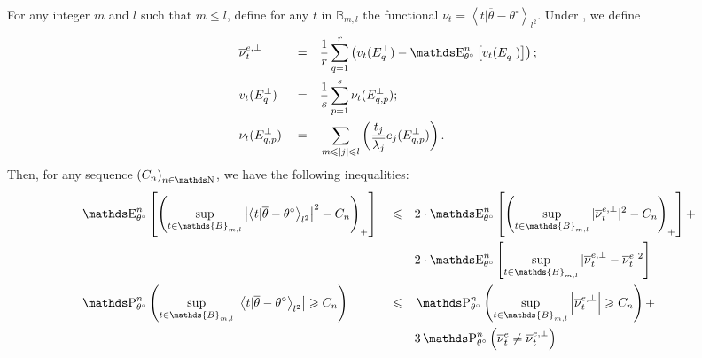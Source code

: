 \begin{pr}\label{PRD.5.4}
For any integer $m$ and $l$ such that $m \leq l$, define for any $t$ in $\mathds{B}_{m, l}$ the functional $\overline{\nu}_{t} = \left\langle t \vert \overline{\theta} - \theta^{\circ}\right\rangle_{l^{2}}$.
Under , we define
\begin{alignat*}{3}
& \overline{\nu}^{e, \perp}_{t} && = && \frac{1}{r} \sum\limits_{q = 1}^{r} \left(v_{t}(E^{\perp}_{q}) - \E_{\theta^{\circ}}^{n}\left[v_{t}(E^{\perp}_{q})\right]\right);\\
& v_{t}(E^{\perp}_{q}) && = && \frac{1}{s} \sum\limits_{p = 1}^{s} \nu_{t}(E^{\perp}_{q, p});\\
& \nu_{t}(E^{\perp}_{q, p}) && = && \sum\limits_{m \leq \vert j \vert \leq l} \left(\frac{t_{j}}{\overline{\lambda_{j}}} e_{j}(E^{\perp}_{q, p})\right).
\end{alignat*}
Then, for any sequence $\left(C_{n}\right)_{n \in \N}$, we have the following inequalities:
\begin{alignat}{3}
& \E_{\theta^{\circ}}^{n} \left[ \left(\sup\limits_{t \in \mathds{B}_{m, l}} \left\vert\left\langle t \vert \overline{\theta} - \theta^{\circ}\right\rangle_{l^{2}} \right\vert^{2} - C_{n} \right)_{+} \right] && \leq && 2 \cdot \E_{\theta^{\circ}}^{n}\left[ \left(\sup\limits_{t \in \mathds{B}_{m, l}} \vert \overline{\nu}^{e, \perp}_{t} \vert^{2} - C_{n} \right)_{+} \right] +\notag\\
& && && 2 \cdot \E_{\theta^{\circ}}^{n}\left[ \sup\limits_{t \in \mathds{B}_{m, l}} \vert \overline{\nu}^{e, \perp}_{t} - \overline{\nu}^{e}_{t} \vert^{2} \right]\label{EQD.26}\\
& \P_{\theta^{\circ}}^{n}\left(\sup\limits_{t \in \mathds{B}_{m, l}} \left\vert \left\langle t \vert \overline{\theta} - \theta^{\circ}\right\rangle_{l^{2}} \right\vert \geq C_{n}\right) && \leq && \P_{\theta^{\circ}}^{n}\left(\sup\limits_{t \in \mathds{B}_{m, l}} \left\vert \overline{\nu}_{t}^{e, \perp} \right\vert \geq C_{n} \right) +\notag\\
& && && 3 \P_{\theta^{\circ}}^{n}\left(\overline{\nu}_{t}^{e} \neq \overline{\nu}_{t}^{e, \perp}\right)\label{EQD.27}
\end{alignat}
\end{pr}

